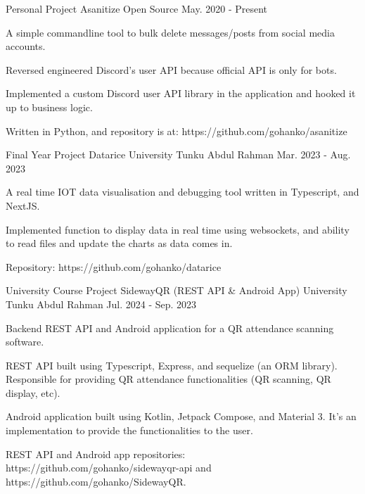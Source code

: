 \begin{cventries}
  \cventry
    {Personal Project} %
    {Asanitize} %
    {Open Source} %
    {May. 2020 - Present} %
    {
      \begin{cvitems} %
          \item {A simple commandline tool to bulk delete messages/posts from social media accounts.}
          \item {Reversed engineered Discord's user API because official API is only for bots.}
          \item {Implemented a custom Discord user API library in the application and hooked it up to business logic.}
          \item {Written in Python, and repository is at: https://github.com/gohanko/asanitize}
      \end{cvitems}
    }

  \cventry
    {Final Year Project} %
    {Datarice} %
    {University Tunku Abdul Rahman} %
    {Mar. 2023 - Aug. 2023} %
    {
      \begin{cvitems} %
          \item {A real time IOT data visualisation and debugging tool written in Typescript, and NextJS.}
          \item {Implemented function to display data in real time using websockets, and ability to read files and update the charts as data comes in.}
          \item {Repository: https://github.com/gohanko/datarice}
      \end{cvitems}
    }

  \cventry
    {University Course Project} %
    {SidewayQR (REST API \& Android App)} %
    {University Tunku Abdul Rahman} %
    {Jul. 2024 - Sep. 2023} %
    {
      \begin{cvitems} %
          \item {Backend REST API and Android application for a QR attendance scanning software.}
          \item {REST API built using Typescript, Express, and sequelize (an ORM library). Responsible for providing QR attendance functionalities (QR scanning, QR display, etc).}
          \item {Android application built using Kotlin, Jetpack Compose, and Material 3. It's an implementation to provide the functionalities to the user.}
          \item {REST API and Android app repositories: https://github.com/gohanko/sidewayqr-api and https://github.com/gohanko/SidewayQR.}
      \end{cvitems}
    }

\end{cventries}